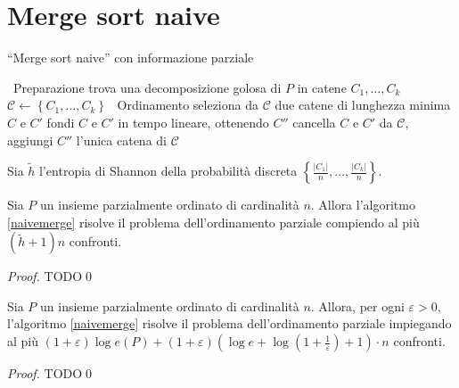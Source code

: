 {\section{Merge sort naive} 
\begin{algorithm}
	\caption{``Merge sort naive'' con informazione parziale} \label{naivemerge} 
	\begin{algorithmic}
		[1] \STATE \, \COMMENT Preparazione \STATE trova una decomposizione golosa di \(P\) in catene \(C_1,\dots,C_k\) \STATE \(\mathcal{C}\leftarrow\left\{C_1,\dots,C_k\right\}\) \STATE \, \COMMENT Ordinamento  \STATE seleziona da \(\mathcal{C}\) due catene di lunghezza minima \(C\) e \(C'\) \STATE fondi \(C\) e \(C'\) in tempo lineare, ottenendo \(C''\) \STATE cancella \(C\) e \(C'\) da \(\mathcal{C}\), aggiungi \(C''\) \ENDWHILE \RETURN l'unica catena di \(\mathcal{C}\) 
	\end{algorithmic}
\end{algorithm}
Sia \(\tilde{h}\) l'entropia di Shannon della probabilità discreta \(\left\{\frac{|C_1|}{n},\dots,\frac{|C_k|}{n}\right\}\). 
\begin{lemma}
	\label{naivemergelemma} Sia \(P\) un insieme parzialmente ordinato di cardinalità \(n\). Allora l'algoritmo \ref{naivemerge} risolve il problema dell'ordinamento parziale compiendo al più \((\tilde{h}+1)n\) confronti. 
\end{lemma}
\begin{proof}
	TODO\qed 
\end{proof}
\begin{theorem}
	\label{naivemergetheorem} Sia \(P\) un insieme parzialmente ordinato di cardinalità \(n\). Allora, per ogni \(\varepsilon>0\), l'algoritmo \ref{naivemerge} risolve il problema dell'ordinamento parziale impiegando al più \((1+\varepsilon)\log{e(P)}+(1+\varepsilon)\left(\log{e}+\log{\left(1+\frac{1}{\varepsilon}\right)}+1\right)\cdot n\) confronti. 
\end{theorem}
\begin{proof}
	TODO\qed 
\end{proof}

}
